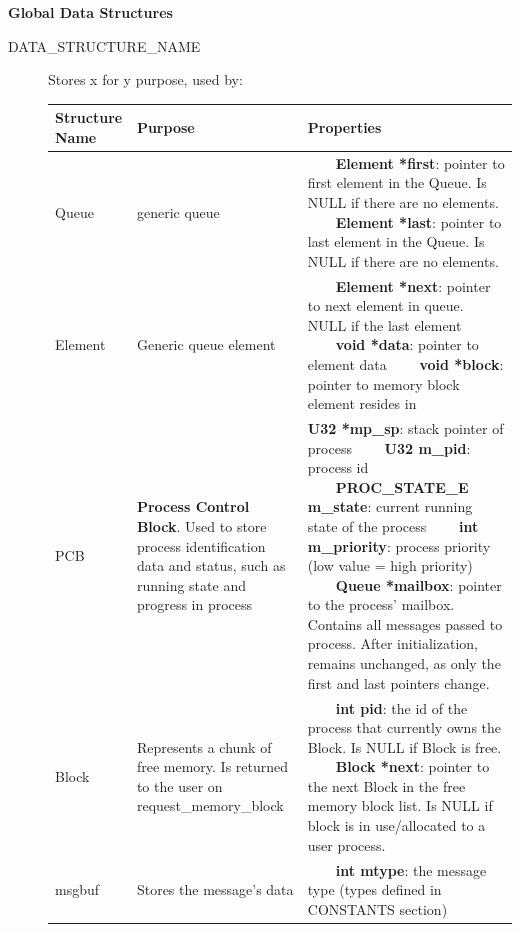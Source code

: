 \documentclass[11pt, oneside]{article}
\newcommand{\tabitem}{~~\llap{\textbullet}~~}
\begin{document}
{\bf Global Data Structures}
\begin{description}
\item [DATA\_STRUCTURE\_NAME] Stores x for y purpose, used by:
\newline
\begin{longtable}{|L{2cm}|L{5cm}|L{5cm}|} \hline
\textbf{Structure Name} & \textbf{Purpose} & \textbf{Properties} \\ \hline
Queue& generic queue &
\tabitem \textbf{Element *first}: pointer to first element in the Queue. Is NULL if there are no elements.
\newline
\tabitem \textbf{Element *last}: pointer to last element in the Queue. Is NULL if there are no elements.\\ \hline
Element & Generic queue element &
\tabitem \textbf{Element *next}: pointer to next element in queue. NULL if the last element
\newline
\tabitem \textbf{void *data}: pointer to element data
\newline
\tabitem \textbf{void *block}: pointer to memory block element resides in \\ \hline
PCB & \textbf{Process Control Block}. Used to store process identification data and status, such as running state and progress in process& \textbf{U32 *mp\_sp}: stack pointer of process \newline
\tabitem \textbf{U32 m\_pid}: process id \newline
\tabitem \textbf{PROC\_STATE\_E m\_state}: current running state of the process \newline
\tabitem \textbf{int m\_priority}: process priority (low value = high priority) \newline
\tabitem \textbf{Queue *mailbox}: pointer to the process' mailbox. Contains all messages passed to process. After initialization, remains unchanged, as only the first and last pointers change.\\ \hline
Block & Represents a chunk of free memory. Is returned to the user on request\_memory\_block &
\tabitem \textbf{int pid}: the id of the process that currently owns the Block. Is NULL if Block is free. \newline
\tabitem \textbf{Block *next}: pointer to the next Block in the free memory block list. Is NULL if block is in use/allocated to a user process. \\ \hline
msgbuf&Stores the message's data&
\tabitem \textbf{int mtype}: the message type (types defined in CONSTANTS section) \newline

\end{longtable}
\end{description}
\end{document}
